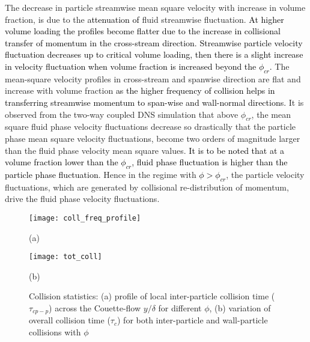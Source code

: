 \documentclass[notitlepage]{revtex4-1}
\begin{document}
The decrease in particle streamwise mean square velocity with increase in volume fraction, is due to the \textcolor{black}{attenuation of} fluid streamwise fluctuation.
\textcolor{black}{At higher volume loading the profiles become flatter due to the increase in collisional transfer of momentum in the cross-stream direction. Streamwise particle velocity fluctuation decreases up to critical volume loading, then there is a slight increase in velocity fluctuation when volume fraction is increased beyond the $\phi_{cr}$.}
The mean-square velocity profiles in cross-stream and spanwise direction are flat and increase with volume fraction \textcolor{black}{as the higher frequency of collision helps in transferring streamwise momentum to span-wise and wall-normal directions.}
It is observed from the two-way coupled DNS simulation that above $\phi_{cr}$, the mean square fluid phase velocity fluctuations decrease so drastically that the particle phase mean square velocity fluctuations, 
become two orders of magnitude larger than the fluid phase velocity mean square values. \textcolor{black}{It is to be noted that at a volume fraction lower than the $\phi_{cr}$, fluid phase fluctuation is higher than the particle phase fluctuation}. Hence in the regime with \textcolor{black}{$\phi>\phi_{cr}$}, the particle velocity fluctuations, which are generated by collisional re-distribution of momentum, drive the fluid phase velocity fluctuations.
\begin{figure}[!]
 	\texttt{[image: coll\_freq\_profile]}
 	\caption*{(a)}
 	\texttt{[image: tot\_coll]}
 	\caption*{(b)}
 	\caption{Collision statistics: (a) profile of local inter-particle collision time ($\tau_{cp-p}$) across the Couette-flow $y/\delta$ for different $\phi$, (b) variation of overall collision time ($\tau_c$) for both inter-particle and wall-particle collisions with $\phi$}
 	\label{fig:coll_stat}
\end{figure}
\end{document}
